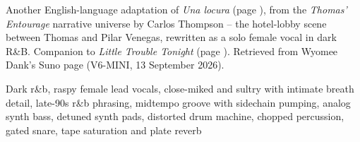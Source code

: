 
\begin{notes}
Another English-language adaptation of \emph{Una locura} (page \pageref{sec:una-locura}), from the \emph{Thomas' Entourage} narrative universe by Carlos Thompson -- the hotel-lobby scene between Thomas and Pilar Venegas, rewritten as a solo female vocal in dark R\&B. Companion to \emph{Little Trouble Tonight} (page \pageref{sec:little-trouble-tonight}). Retrieved from Wyomee Dank's Suno page (V6-MINI, 13 September 2026).
\end{notes}
\begin{style}
Dark r\&b, raspy female lead vocals, close-miked and sultry with intimate breath detail, late-90s r\&b phrasing, midtempo groove with sidechain pumping, analog synth bass, detuned synth pads, distorted drum machine, chopped percussion, gated snare, tape saturation and plate reverb
\end{style}
